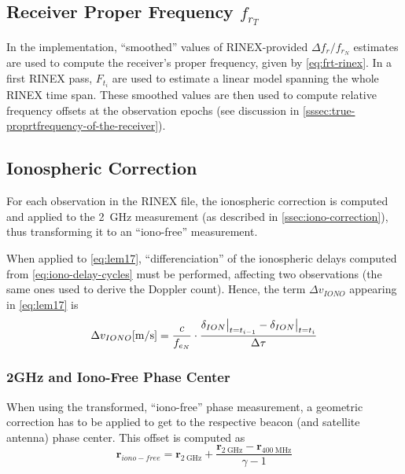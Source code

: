 \subsection{Receiver Proper Frequency $f_{r_T}$}\label{ssec:receiver-true-proper-frequency}
In the implementation, ``smoothed'' values of RINEX-provided $\Delta f_r / f_{r_N}$ estimates 
are used to compute the receiver's proper frequency, given by \autoref{eq:frt-rinex}.
In a first RINEX pass, $F_{t_i}$ are used to estimate a linear model spanning the 
whole RINEX time span. These smoothed values are then used to compute relative 
frequency offsets at the observation epochs (see discussion in \autoref{sssec:true-proprtfrequency-of-the-receiver}). 

\subsection{Ionospheric Correction}\label{ssec:iono-correction}
For each observation in the RINEX file, the ionospheric correction is computed and applied 
to the \SI{2}{\GHz} measurement (as described in \autoref{ssec:iono-correction}), thus 
transforming it to an ``iono-free'' measurement.

When applied to \autoref{eq:lem17}, ``differenciation'' of the ionospheric 
delays computed from \ref{eq:iono-delay-cycles} must be performed, affecting two 
observations (the same ones used to derive the Doppler count). Hence, the term 
$\Delta v_{IONO}$ appearing in \autoref{eq:lem17} is
\begin{equation}
  \Delta v_{IONO} [\si{\m \per \s}] = 
    \frac{c}{f_{e_N}}
    \cdot 
    \frac{\delta_{ION}\at[\big]{t=t_{i-1}} 
    - \delta_{ION}\at[\big]{t=t_i}}{\Delta \tau}
  \label{eq:dion-diff}
\end{equation}

\subsubsection{2GHz and Iono-Free Phase Center}\label{sssec:2ghz-ionofree-pco}
When using the transformed, ``iono-free'' phase measurement, a geometric correction 
has to be applied to get to the respective beacon (and satellite antenna) phase 
center. This offset is computed as
\begin{equation}\label{eq:ionf-pco}
  \bm{r}_{iono-free} = \bm{r}_{\SI{2}{\GHz}} + \frac{\bm{r}_{\SI{2}{\GHz}} 
    - \bm{r}_{\SI{400}{\MHz}}}{\gamma - 1}
\end{equation}

